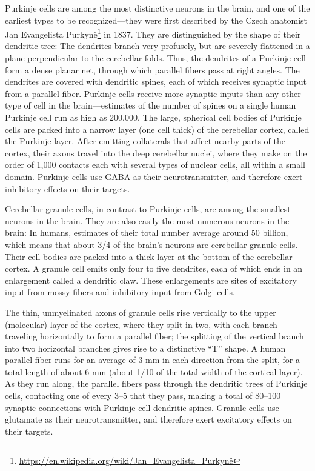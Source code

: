 \documentclass[]{book}
\let\rmarkdownfootnote\footnote%
\def\footnote{\protect\rmarkdownfootnote}
\renewcommand{\href}[2]{#2\footnote{\url{#1}}}
\begin{document}
Purkinje cells are among the most distinctive neurons in the brain, and one of the earliest types to be recognized---they were first described by the Czech anatomist \href{https://en.wikipedia.org/wiki/Jan_Evangelista_Purkyně}{Jan Evangelista Purkyně} in 1837. They are distinguished by the shape of their dendritic tree: The dendrites branch very profusely, but are severely flattened in a plane perpendicular to the cerebellar folds. Thus, the dendrites of a Purkinje cell form a dense planar net, through which parallel fibers pass at right angles. The dendrites are covered with dendritic spines, each of which receives synaptic input from a parallel fiber. Purkinje cells receive more synaptic inputs than any other type of cell in the brain---estimates of the number of spines on a single human Purkinje cell run as high as 200,000. The large, spherical cell bodies of Purkinje cells are packed into a narrow layer (one cell thick) of the cerebellar cortex, called the Purkinje layer. After emitting collaterals that affect nearby parts of the cortex, their axons travel into the deep cerebellar nuclei, where they make on the order of 1,000 contacts each with several types of nuclear cells, all within a small domain. Purkinje cells use GABA as their neurotransmitter, and therefore exert inhibitory effects on their targets.

Cerebellar granule cells, in contrast to Purkinje cells, are among the smallest neurons in the brain. They are also easily the most numerous neurons in the brain: In humans, estimates of their total number average around 50 billion, which means that about 3/4 of the brain's neurons are cerebellar granule cells. Their cell bodies are packed into a thick layer at the bottom of the cerebellar cortex. A granule cell emits only four to five dendrites, each of which ends in an enlargement called a dendritic claw. These enlargements are sites of excitatory input from mossy fibers and inhibitory input from Golgi cells.

The thin, unmyelinated axons of granule cells rise vertically to the upper (molecular) layer of the cortex, where they split in two, with each branch traveling horizontally to form a parallel fiber; the splitting of the vertical branch into two horizontal branches gives rise to a distinctive ``T'' shape. A human parallel fiber runs for an average of 3 mm in each direction from the split, for a total length of about 6 mm (about 1/10 of the total width of the cortical layer). As they run along, the parallel fibers pass through the dendritic trees of Purkinje cells, contacting one of every 3--5 that they pass, making a total of 80--100 synaptic connections with Purkinje cell dendritic spines. Granule cells use glutamate as their neurotransmitter, and therefore exert excitatory effects on their targets.
\end{document}
